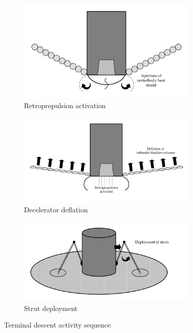 \begin{figure}[h]
	\centering
	\begin{subfigure}[b]{0.44\textwidth}
		\includegraphics[width=0.96\textwidth]{./Figure/CrewModule/TDa.pdf}
		\caption{Retropropulsion activation}
		\label{fig:rot}
	\end{subfigure}
	\begin{subfigure}[b]{0.54\textwidth}
		\includegraphics[width=0.96\textwidth]{./Figure/CrewModule/TDb.pdf}
		\caption{Decelerator deflation}
		\label{fig:fold}
	\end{subfigure}
		\begin{subfigure}[b]{0.55\textwidth}
		\centering
			\includegraphics[width=0.96\textwidth]{./Figure/CrewModule/TDc.pdf}
			\caption{Strut deployment}
			\label{fig:hinge}
		\end{subfigure}
	\caption{Terminal descent activity sequence}
	\label{fig:tdseq}
\end{figure}


